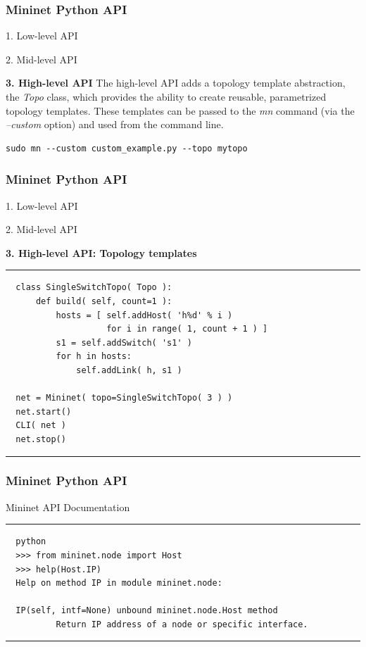 \documentclass{beamer}
\begin{document}
\begin{frame}[fragile]
  \frametitle{Mininet Python API}

  \begin{block}{1. Low-level API}
  \end{block}
  \begin{block}{2. Mid-level API}
  \end{block}
  \begin{block}{\textbf{3. High-level API}}
    The high-level API adds a topology template abstraction, the
    \textit{Topo} class, which provides the ability to create
    reusable, parametrized topology templates. These templates can be
    passed to the \textit{mn} command (via the \textit{--custom}
    option) and used from the command line.
\begin{verbatim}
sudo mn --custom custom_example.py --topo mytopo
\end{verbatim}    
  \end{block}
\end{frame}
\begin{frame}[fragile]
  \frametitle{Mininet Python API}

  \begin{block}{1. Low-level API}
  \end{block}
  \begin{block}{2. Mid-level API}
  \end{block}
  \begin{block}{\textbf{3. High-level API: Topology templates}}
    \rule{0.5\textwidth}{0.5pt}
    \scriptsize
\begin{verbatim}
  class SingleSwitchTopo( Topo ):
      def build( self, count=1 ):
          hosts = [ self.addHost( 'h%d' % i )
                    for i in range( 1, count + 1 ) ]
          s1 = self.addSwitch( 's1' )
          for h in hosts:
              self.addLink( h, s1 )

  net = Mininet( topo=SingleSwitchTopo( 3 ) )
  net.start()
  CLI( net )
  net.stop()
\end{verbatim}
    \rule{0.5\textwidth}{0.5pt}
  \end{block}
\end{frame}
\begin{frame}[fragile]
  \frametitle{Mininet Python API}

  \begin{block}{Mininet API Documentation}
    \rule{\textwidth}{0.5pt}
    \footnotesize
\begin{verbatim}
  python
  >>> from mininet.node import Host
  >>> help(Host.IP)
  Help on method IP in module mininet.node:

  IP(self, intf=None) unbound mininet.node.Host method
          Return IP address of a node or specific interface.
\end{verbatim}
    \rule{\textwidth}{0.5pt}
\end{block}
\end{frame}
\end{document}

